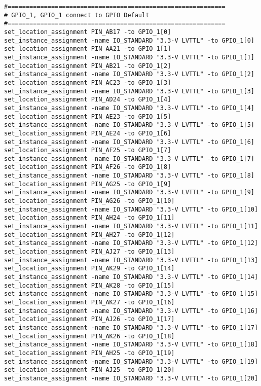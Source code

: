 \documentclass[dvipdfm]{book}
\begin{document}
\begin{verbatim}
#============================================================
# GPIO_1, GPIO_1 connect to GPIO Default
#============================================================
set_location_assignment PIN_AB17 -to GPIO_1[0]
set_instance_assignment -name IO_STANDARD "3.3-V LVTTL" -to GPIO_1[0]
set_location_assignment PIN_AA21 -to GPIO_1[1]
set_instance_assignment -name IO_STANDARD "3.3-V LVTTL" -to GPIO_1[1]
set_location_assignment PIN_AB21 -to GPIO_1[2]
set_instance_assignment -name IO_STANDARD "3.3-V LVTTL" -to GPIO_1[2]
set_location_assignment PIN_AC23 -to GPIO_1[3]
set_instance_assignment -name IO_STANDARD "3.3-V LVTTL" -to GPIO_1[3]
set_location_assignment PIN_AD24 -to GPIO_1[4]
set_instance_assignment -name IO_STANDARD "3.3-V LVTTL" -to GPIO_1[4]
set_location_assignment PIN_AE23 -to GPIO_1[5]
set_instance_assignment -name IO_STANDARD "3.3-V LVTTL" -to GPIO_1[5]
set_location_assignment PIN_AE24 -to GPIO_1[6]
set_instance_assignment -name IO_STANDARD "3.3-V LVTTL" -to GPIO_1[6]
set_location_assignment PIN_AF25 -to GPIO_1[7]
set_instance_assignment -name IO_STANDARD "3.3-V LVTTL" -to GPIO_1[7]
set_location_assignment PIN_AF26 -to GPIO_1[8]
set_instance_assignment -name IO_STANDARD "3.3-V LVTTL" -to GPIO_1[8]
set_location_assignment PIN_AG25 -to GPIO_1[9]
set_instance_assignment -name IO_STANDARD "3.3-V LVTTL" -to GPIO_1[9]
set_location_assignment PIN_AG26 -to GPIO_1[10]
set_instance_assignment -name IO_STANDARD "3.3-V LVTTL" -to GPIO_1[10]
set_location_assignment PIN_AH24 -to GPIO_1[11]
set_instance_assignment -name IO_STANDARD "3.3-V LVTTL" -to GPIO_1[11]
set_location_assignment PIN_AH27 -to GPIO_1[12]
set_instance_assignment -name IO_STANDARD "3.3-V LVTTL" -to GPIO_1[12]
set_location_assignment PIN_AJ27 -to GPIO_1[13]
set_instance_assignment -name IO_STANDARD "3.3-V LVTTL" -to GPIO_1[13]
set_location_assignment PIN_AK29 -to GPIO_1[14]
set_instance_assignment -name IO_STANDARD "3.3-V LVTTL" -to GPIO_1[14]
set_location_assignment PIN_AK28 -to GPIO_1[15]
set_instance_assignment -name IO_STANDARD "3.3-V LVTTL" -to GPIO_1[15]
set_location_assignment PIN_AK27 -to GPIO_1[16]
set_instance_assignment -name IO_STANDARD "3.3-V LVTTL" -to GPIO_1[16]
set_location_assignment PIN_AJ26 -to GPIO_1[17]
set_instance_assignment -name IO_STANDARD "3.3-V LVTTL" -to GPIO_1[17]
set_location_assignment PIN_AK26 -to GPIO_1[18]
set_instance_assignment -name IO_STANDARD "3.3-V LVTTL" -to GPIO_1[18]
set_location_assignment PIN_AH25 -to GPIO_1[19]
set_instance_assignment -name IO_STANDARD "3.3-V LVTTL" -to GPIO_1[19]
set_location_assignment PIN_AJ25 -to GPIO_1[20]
set_instance_assignment -name IO_STANDARD "3.3-V LVTTL" -to GPIO_1[20]

\end{verbatim}
\end{document}
